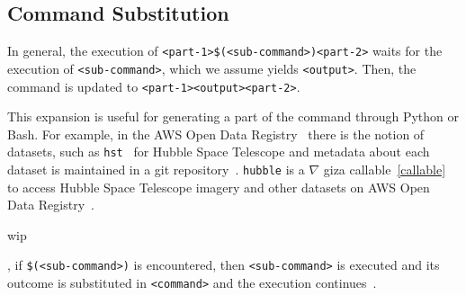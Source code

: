 \subsection{Command Substitution}
\label{command_substitution}

In general, the execution of \texttt{<part-1>\$(<sub-command>)<part-2>} waits for the execution of \texttt{<sub-command>}, which we assume yields \texttt{<output>}. Then, the command is updated to \texttt{<part-1><output><part-2>}.





This expansion is useful for generating a part of the command through Python or Bash. For example, in the AWS Open Data Registry~ there is the notion of datasets, such as \texttt{hst}~ for Hubble Space Telescope and metadata about each dataset is maintained in a git repository~. \texttt{hubble} is a $\nabla$ giza callable~\ref{callable} to access Hubble Space Telescope imagery and other datasets on AWS Open Data Registry~.




wip

, if \texttt{\$(<sub-command>)} is encountered, then \texttt{<sub-command>} is executed and its outcome is substituted in \texttt{<command>} and the execution continues~.




